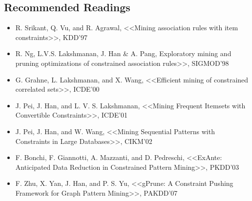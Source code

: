 \subsection{Recommended Readings}
\begin{itemize}
\item R. Srikant, Q. Vu, and R. Agrawal, <<Mining association rules with item constraints>>, KDD'97
\item R. Ng, L.V.S. Lakshmanan, J. Han \& A. Pang, Exploratory mining and pruning optimizations of constrained association rules>>, SIGMOD’98
\item G. Grahne, L. Lakshmanan, and X. Wang, <<Efficient mining of constrained correlated sets>>, ICDE'00
\item J. Pei, J. Han, and L. V. S. Lakshmanan, <<Mining Frequent Itemsets with Convertible Constraints>>, ICDE'01
\item J. Pei, J. Han, and W. Wang, <<Mining Sequential Patterns with Constraints in Large Databases>>, CIKM'02
\item F. Bonchi, F. Giannotti, A. Mazzanti, and D. Pedreschi, <<ExAnte: Anticipated Data Reduction in Constrained Pattern Mining>>, PKDD'03
\item F. Zhu, X. Yan, J. Han, and P. S. Yu, <<gPrune: A Constraint Pushing Framework for Graph Pattern Mining>>, PAKDD'07
\end{itemize}
